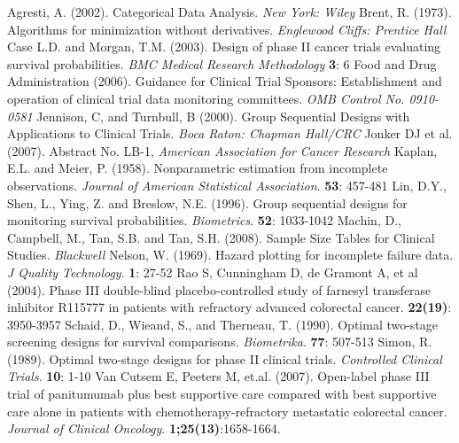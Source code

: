 \documentclass[12pt]{article}
\begin{document}
\begin{thebibliography}{}
 Agresti, A. (2002). Categorical Data Analysis. {\it New York: Wiley}
 Brent, R. (1973). Algorithms for minimization without derivatives. {\it Englewood Cliffs: Prentice Hall}
 Case L.D. and Morgan, T.M. (2003). Design of phase II cancer trials evaluating survival probabilities. {\it BMC Medical Research Methodology} {\bf 3}: 6
 Food and Drug Administration (2006).  Guidance for Clinical Trial Sponsors:  Establishment and operation of clinical trial data monitoring committees.  {\it OMB Control No. 0910-0581}
 Jennison, C, and Turnbull, B (2000).  Group Sequential Designs with Applications to Clinical Trials.  {\it Boca Raton: Chapman Hall/CRC}
 Jonker DJ et al. (2007).  Abstract No. LB-1, {\it American Association for Cancer Research}
 Kaplan, E.L. and Meier, P. (1958). Nonparametric estimation from incomplete observations. {\it Journal of American Statistical Association}. {\bf 53}: 457-481
 Lin, D.Y., Shen, L., Ying, Z. and Breslow, N.E. (1996). Group sequential designs for monitoring survival probabilities. {\it Biometrics}. {\bf 52}: 1033-1042
 Machin, D., Campbell, M., Tan, S.B. and Tan, S.H. (2008). Sample Size Tables for
Clinical Studies. {\it Blackwell}
 Nelson, W. (1969). Hazard plotting for incomplete failure data. {\it J Quality Technology}. {\bf 1}: 27-52
 Rao S, Cunningham D, de Gramont A, et al (2004).  Phase III double-blind placebo-controlled study of farnesyl transferase
inhibitor R115777 in patients with refractory advanced colorectal cancer.
{\bf 22(19)}: 3950-3957
 Schaid, D., Wieand, S., and Therneau, T. (1990).  Optimal two-stage screening designs for survival comparisons. {\it Biometrika}.
{\bf 77}: 507-513
 Simon, R. (1989). Optimal two-stage designs for phase II clinical trials. {\it Controlled Clinical Trials}. {\bf 10}: 1-10
 Van Cutsem E, Peeters M, et.al. (2007).  Open-label phase III trial of panitumumab plus best
supportive care compared with best supportive care alone in patients with
chemotherapy-refractory metastatic colorectal cancer. {\it Journal of Clinical Oncology}. {\bf 1;25(13)}:1658-1664.
\end{thebibliography}
\end{document}
